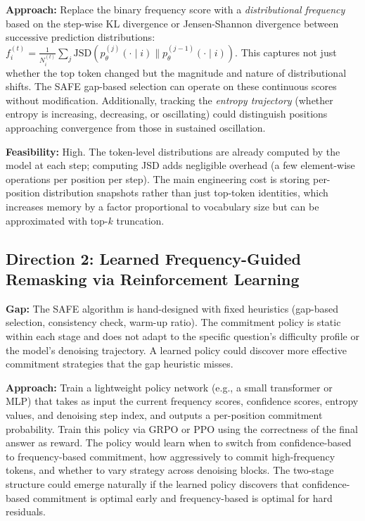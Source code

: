 \documentclass[11pt,a4paper]{article}
\begin{document}
\textbf{Approach:} Replace the binary frequency score with a \emph{distributional frequency} based on the step-wise KL divergence or Jensen-Shannon divergence between successive prediction distributions: $f_i^{(t)} = \frac{1}{N_i^{(t)}} \sum_j \mathrm{JSD}(p_\theta^{(j)}(\cdot \mid i) \| p_\theta^{(j-1)}(\cdot \mid i))$. This captures not just whether the top token changed but the magnitude and nature of distributional shifts. The SAFE gap-based selection can operate on these continuous scores without modification. Additionally, tracking the \emph{entropy trajectory} (whether entropy is increasing, decreasing, or oscillating) could distinguish positions approaching convergence from those in sustained oscillation.

\textbf{Feasibility:} High. The token-level distributions are already computed by the model at each step; computing JSD adds negligible overhead (a few element-wise operations per position per step). The main engineering cost is storing per-position distribution snapshots rather than just top-token identities, which increases memory by a factor proportional to vocabulary size but can be approximated with top-$k$ truncation.

\subsection{Direction 2: Learned Frequency-Guided Remasking via Reinforcement Learning}
\textbf{Gap:} The SAFE algorithm is hand-designed with fixed heuristics (gap-based selection, consistency check, warm-up ratio). The commitment policy is static within each stage and does not adapt to the specific question's difficulty profile or the model's denoising trajectory. A learned policy could discover more effective commitment strategies that the gap heuristic misses.

\textbf{Approach:} Train a lightweight policy network (e.g., a small transformer or MLP) that takes as input the current frequency scores, confidence scores, entropy values, and denoising step index, and outputs a per-position commitment probability. Train this policy via GRPO or PPO using the correctness of the final answer as reward. The policy would learn when to switch from confidence-based to frequency-based commitment, how aggressively to commit high-frequency tokens, and whether to vary strategy across denoising blocks. The two-stage structure could emerge naturally if the learned policy discovers that confidence-based commitment is optimal early and frequency-based is optimal for hard residuals.
\end{document}
